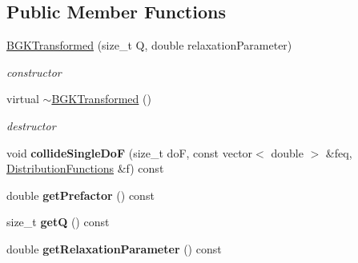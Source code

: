 \subsection*{Public Member Functions}
\begin{DoxyCompactItemize}
\item 
\hyperlink{classnatrium_1_1BGKTransformed_af0293d10fd8072e89a3cff2d645bc292}{B\-G\-K\-Transformed} (size\-\_\-t Q, double relaxation\-Parameter)
\begin{DoxyCompactList}\small\item\em constructor \end{DoxyCompactList}\item 
\hypertarget{classnatrium_1_1BGKTransformed_a554c68facfbd2b126f24504f215eb193}{virtual \hyperlink{classnatrium_1_1BGKTransformed_a554c68facfbd2b126f24504f215eb193}{$\sim$\-B\-G\-K\-Transformed} ()}\label{classnatrium_1_1BGKTransformed_a554c68facfbd2b126f24504f215eb193}

\begin{DoxyCompactList}\small\item\em destructor \end{DoxyCompactList}\item 
\hypertarget{classnatrium_1_1BGKTransformed_a6bb41acd37234d2f92a9d868ff2486e1}{void {\bfseries collide\-Single\-Do\-F} (size\-\_\-t do\-F, const vector$<$ double $>$ \&feq, \hyperlink{classnatrium_1_1DistributionFunctions}{Distribution\-Functions} \&f) const }\label{classnatrium_1_1BGKTransformed_a6bb41acd37234d2f92a9d868ff2486e1}

\item 
\hypertarget{classnatrium_1_1BGKTransformed_a71cfddc7d12e0a4fe6034ac23c5ee880}{double {\bfseries get\-Prefactor} () const }\label{classnatrium_1_1BGKTransformed_a71cfddc7d12e0a4fe6034ac23c5ee880}

\item 
\hypertarget{classnatrium_1_1BGKTransformed_a34f4f34765839a8f657359ea8dcaa5d8}{size\-\_\-t {\bfseries get\-Q} () const }\label{classnatrium_1_1BGKTransformed_a34f4f34765839a8f657359ea8dcaa5d8}

\item 
\hypertarget{classnatrium_1_1BGKTransformed_aaf011540ec017dffca348d600990d063}{double {\bfseries get\-Relaxation\-Parameter} () const }\label{classnatrium_1_1BGKTransformed_aaf011540ec017dffca348d600990d063}

\end{DoxyCompactItemize}
